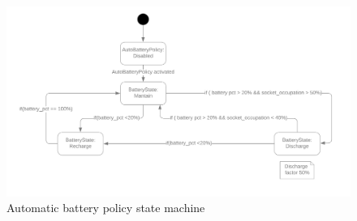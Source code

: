 \begin{center}
    \begin{figure}[H]
        \includegraphics[width=\textwidth]{./img/battery_policy.png}
        \caption{Automatic battery policy state machine}
        \label{battery_policy}
    \end{figure}
\end{center}